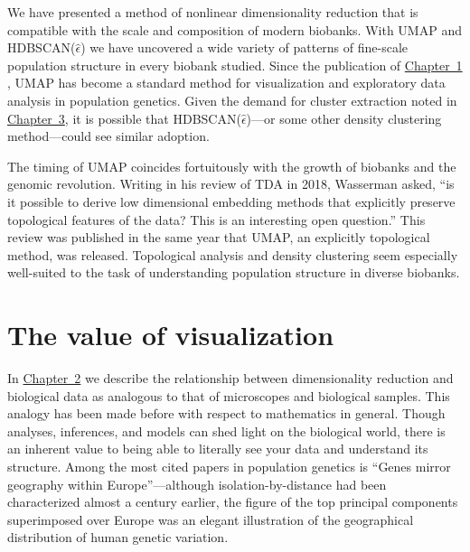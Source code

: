 We have presented a method of nonlinear dimensionality reduction that is compatible with the scale and composition of modern biobanks. With UMAP and HDBSCAN($\hat{\epsilon}$) we have uncovered a wide variety of patterns of fine-scale population structure in every biobank studied. Since the publication of \hyperref[chap:chapter1]{Chapter~1} , UMAP has become a standard method for visualization and exploratory data analysis in population genetics. Given the demand for cluster extraction noted in \hyperref[chap:chapter3]{Chapter~3}, it is possible that HDBSCAN($\hat{\epsilon}$)---or some other density clustering method---could see similar adoption.

The timing of UMAP coincides fortuitously with the growth of biobanks and the genomic revolution. Writing in his review of TDA in 2018, Wasserman asked, ``is it possible to derive low dimensional embedding methods that explicitly preserve topological features of the data? This is an interesting open question.''\citep{wasserman_topological_2018} This review was published in the same year that UMAP, an explicitly topological method, was released. Topological analysis and density clustering seem especially well-suited to the task of understanding population structure in diverse biobanks.

\section{The value of visualization}

In \hyperref[chap:chapter2]{Chapter~2} we describe the relationship between dimensionality reduction and biological data as analogous to that of microscopes and biological samples. This analogy has been made before with respect to mathematics in general\citep{cohen_mathematics_2004}. Though analyses, inferences, and models can shed light on the biological world, there is an inherent value to being able to literally see your data and understand its structure. Among the most cited papers in population genetics is ``Genes mirror geography within Europe''\citep{novembre2008europe}---although isolation-by-distance had been characterized almost a century earlier, the figure of the top principal components superimposed over Europe was an elegant illustration of the geographical distribution of human genetic variation.

